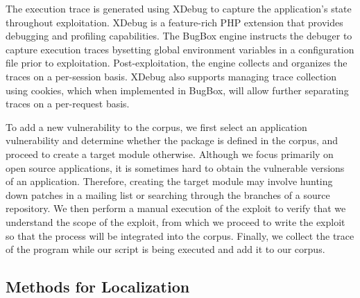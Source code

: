 \documentclass[letterpaper,twocolumn,10pt]{article}
\begin{document}
The execution trace is generated using XDebug to capture the application's state throughout exploitation. XDebug is a feature-rich PHP extension that provides debugging and profiling capabilities. The BugBox engine instructs the debuger to capture execution traces bysetting global environment variables in a configuration file prior to exploitation. Post-exploitation, the engine collects and organizes the traces on a per-session basis. XDebug also supports managing trace collection using cookies, which when implemented in BugBox, will allow further separating traces on a per-request basis.  \par

To add a new vulnerability to the corpus, we first select an application vulnerability and determine whether the package is defined in the corpus, and proceed to create a target module otherwise. Although we focus primarily on open source applications, it is sometimes hard to obtain the vulnerable versions of an application. Therefore, creating the target module may involve hunting down patches in a mailing list or searching through the branches of a source repository. We then perform a manual execution of the exploit to verify that we understand the scope of the exploit, from which we proceed to write the exploit so that the process will be integrated into the corpus. Finally, we collect the trace of the program while our script is being executed and add it to our corpus.\par


\subsection{Methods for Localization}
\end{document}
